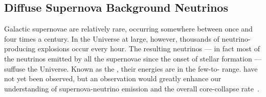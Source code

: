 




\subsection{Diffuse Supernova Background Neutrinos}

Galactic supernovae are relatively rare, occurring somewhere between
once and four times a century. In the Universe
at large, however, thousands of neutrino-producing explosions occur
every hour.  The resulting neutrinos --- in fact most of the neutrinos
emitted by all the supernovae since the onset of stellar formation ---
suffuse the Universe.  Known as the %
, their energies are in the few-to- range.  
have not yet been observed, but an observation would greatly enhance
our understanding of supernova-neutrino emission and the overall
core-collapse rate~\cite{Beacom:2010kk, Lunardini:2012ne, Moller:2018kpn}.


